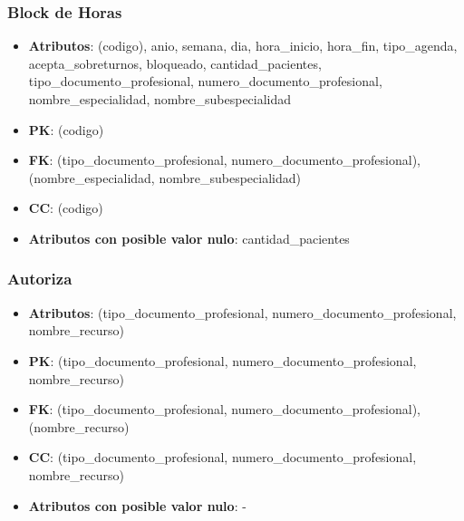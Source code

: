 \documentclass[a4paper,11pt]{article}
\begin{document}
\subsubsection{\textbf{Block de Horas}}

\begin{itemize}

\item 
\textbf{Atributos}:  (codigo), anio, semana, dia, hora\_inicio, hora\_fin, tipo\_agenda, acepta\_sobreturnos,  bloqueado, cantidad\_pacientes, tipo\_documento\_profesional, numero\_documento\_profesional, nombre\_especialidad, nombre\_subespecialidad

\item 
\textbf{PK}: (codigo)

\item
\textbf{FK}:  (tipo\_documento\_profesional, numero\_documento\_profesional), (nombre\_especialidad, nombre\_subespecialidad)

\item 
\textbf{CC}: (codigo)

\item 
\textbf{Atributos con posible valor nulo}: cantidad\_pacientes

\end{itemize}
\subsubsection{\textbf{Autoriza}}

\begin{itemize}

\item 
\textbf{Atributos}: (tipo\_documento\_profesional, numero\_documento\_profesional, nombre\_recurso)

\item 
\textbf{PK}: (tipo\_documento\_profesional, numero\_documento\_profesional, nombre\_recurso)

\item
\textbf{FK}: (tipo\_documento\_profesional, numero\_documento\_profesional), (nombre\_recurso)

\item 
\textbf{CC}: (tipo\_documento\_profesional, numero\_documento\_profesional, nombre\_recurso)

\item 
\textbf{Atributos con posible valor nulo}: -

\end{itemize}
\end{document}
